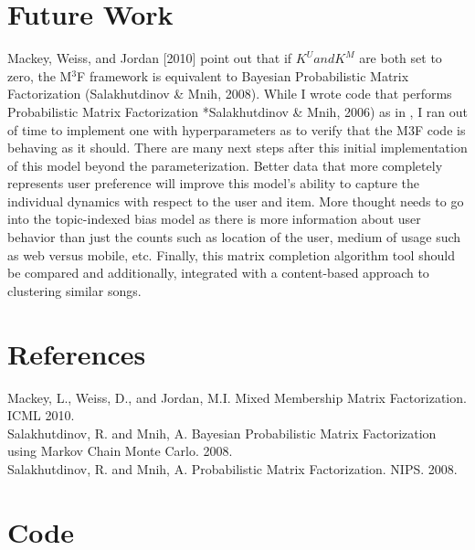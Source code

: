 \documentclass{article}
\begin{document}
\section{Future Work}
\noindent
Mackey, Weiss, and Jordan [2010] point out that if $K^U and K^M$ are both set to zero, the M$^3$F framework is equivalent to Bayesian Probabilistic Matrix Factorization (Salakhutdinov \& Mnih, 2008).  While I wrote code that performs Probabilistic Matrix Factorization *Salakhutdinov \& Mnih, 2006) as in , I ran out of time to implement one with hyperparameters as to verify that the M3F code is behaving as it should. There are many next steps after this initial implementation of this model beyond the parameterization.  Better data that more completely represents user preference will improve this model's ability to capture the individual dynamics with respect to the user and item.  More thought needs to go into the topic-indexed bias model as there is more information about user behavior than just the counts such as location of the user, medium of usage such as web versus mobile, etc. Finally, this matrix completion algorithm tool should be compared and additionally, integrated with a content-based approach to clustering similar songs.


\section{References}
Mackey, L., Weiss, D., and Jordan, M.I. Mixed Membership Matrix Factorization. ICML 2010. \\

\noindent
Salakhutdinov, R. and Mnih, A. Bayesian Probabilistic Matrix Factorization using Markov Chain Monte Carlo. 2008.\\

\noindent
Salakhutdinov, R. and Mnih, A. Probabilistic Matrix Factorization. NIPS. 2008.


\section{Code}
\renewcommand*\familydefault{\ttdefault}

\newcommand{\code}[2]{
\hrulefill
\subsection*{#1}

\vspace{2em}
}

\newpage


\newpage

\end{document}
